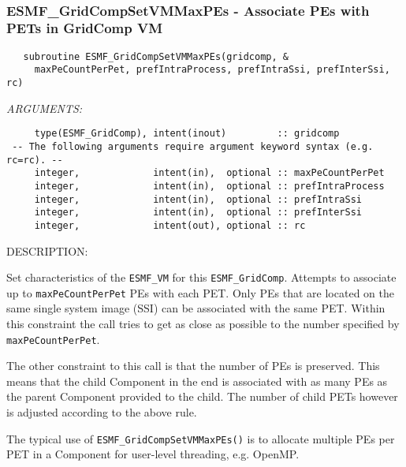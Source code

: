  
\mbox{}\hrulefill\ 
 
\subsubsection [ESMF\_GridCompSetVMMaxPEs] {ESMF\_GridCompSetVMMaxPEs - Associate PEs with PETs in GridComp VM}


  
\begin{verbatim}   subroutine ESMF_GridCompSetVMMaxPEs(gridcomp, &
     maxPeCountPerPet, prefIntraProcess, prefIntraSsi, prefInterSsi, rc)\end{verbatim}{\em ARGUMENTS:}
\begin{verbatim}     type(ESMF_GridComp), intent(inout)         :: gridcomp
 -- The following arguments require argument keyword syntax (e.g. rc=rc). --
     integer,             intent(in),  optional :: maxPeCountPerPet
     integer,             intent(in),  optional :: prefIntraProcess
     integer,             intent(in),  optional :: prefIntraSsi
     integer,             intent(in),  optional :: prefInterSsi
     integer,             intent(out), optional :: rc\end{verbatim}
{\sf DESCRIPTION:\\ }


     Set characteristics of the {\tt ESMF\_VM} for this {\tt ESMF\_GridComp}.
     Attempts to associate up to {\tt maxPeCountPerPet} PEs with each PET. Only
     PEs that are located on the same single system image (SSI) can be associated
     with the same PET. Within this constraint the call tries to get as close as
     possible to the number specified by {\tt maxPeCountPerPet}.
  
     The other constraint to this call is that the number of PEs is preserved.
     This means that the child Component in the end is associated with as many
     PEs as the parent Component provided to the child. The number of child PETs
     however is adjusted according to the above rule.
  
     The typical use of {\tt ESMF\_GridCompSetVMMaxPEs()} is to allocate
     multiple PEs per PET in a Component for user-level threading, e.g. OpenMP.
  
